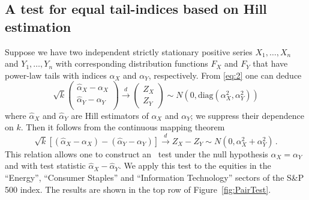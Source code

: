 \subsection{A test for equal tail-indices based on Hill estimation}
Suppose we have two independent strictly stationary positive series $X_1, \dots, X_n $ and
$Y_1, \dots, Y_n$ with corresponding distribution functions $F_X$ and
$F_Y$ that have power-law tails  with indices $\alpha_X$ and
$\alpha_Y$, respectively. From \eqref{eq:2} one can deduce
\begin{equation}
  \label{eq:x3}
  \sqrt k
  \begin{pmatrix}
    {\hat \alpha_X - \alpha_X} \\
    {\hat \alpha_Y - \alpha_Y} \\
  \end{pmatrix} \overset{d}{\to}
  \begin{pmatrix}
    Z_X \\
    Z_Y
  \end{pmatrix}
  \sim
  N\left(
    0, \text{diag}(\alpha_X^2, \alpha_Y^2)
  \right)
\end{equation}
where $\hat \alpha_X$ and $\hat \alpha_Y$ are Hill estimators of
$\alpha_X$ and $\alpha_Y$; we suppress their dependence on $k$. Then it follows from the continuous mapping
theorem
\begin{equation}
  \label{eq:x1}
  \sqrt k [(\hat \alpha_X -\alpha_X) - (\hat \alpha_Y - \alpha_Y)]
  \overset{d}{\to}
  Z_X - Z_Y \sim N(0, \alpha_X^2 + \alpha_Y^2)\,.
\end{equation}
This relation allows one to construct an \asy\ test under 
the null hypothesis $\alpha_X = \alpha_Y$ and with test statistic $\hat \alpha_X - \hat \alpha_Y$.
We apply this test to the equities in the ``Energy'',
``Consumer Staples'' and ``Information Technology''
sectors of the S\&P 500 index. The results are shown in the top row of
Figure~\ref{fig:PairTest}.
